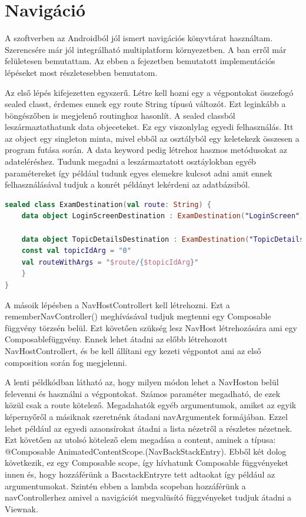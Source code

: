 \section{Navigáció}
\label{sec:Nav}

A szoftverben az Androidból jól ismert navigációs könyvtárat használtam.
Szerencsére már jól integrálható multiplatform környezetben.
A ban erről már felületesen bemutattam.
Az ebben a fejezetben bemutatott implementációs lépéseket most részletesebben bemutatom.

Az első lépés kifejezetten egyszerű.
Létre kell hozni egy a végpontokat összefogó sealed classt, érdemes ennek egy route String típusú változót.
Ezt leginkább a böngészőben is megjelenő routinghoz hasonlít.
A sealed classból leszármaztathatunk data objeceteket. Ez egy viszonlylag egyedi felhasználás.
Itt az object egy singleton minta, mivel ebből az osztályból egy keletekezk összesen a program futása során.
A data keyword pedig létrehoz hasznos metódusokat az adateléréshez.
Tudunk megadni a leszármaztatott osztáylokban egyéb paramétereket így például tudunk egyes elemekre kulcsot adni amit ennek felhasználásával tudjuk a konrét példányt lekérdeni az adatbázsiból.

\begin{lstlisting}[caption={Példa a végpontok felvételére.}, label={lst:NavDestExample}, language=Kotlin]
sealed class ExamDestination(val route: String) {
    data object LoginScreenDestination : ExamDestination("LoginScreen")

    data object TopicDetailsDestination : ExamDestination("TopicDetails") {
    const val topicIdArg = "0"
    val routeWithArgs = "$route/{$topicIdArg}"
    }
}        
\end{lstlisting}

A másoik lépésben a NavHostControllert kell létrehozni. Ezt a rememberNavController() meghívásával tudjuk megtenni egy Composable függvény törzsén belül.
Ezt követően szükség lesz NavHost létrehozására ami egy Composablefüggvény.
Ennek lehet átadni az előbb létrehozott NavHostControllert, és be kell állítani egy kezeti végpontot ami az első composition során fog megjelenni.

A lenti példkódban látható az, hogy milyen módon lehet a NavHoston belül felevenni és használni a végpontokat.
Számos paraméter megadható, de ezek közül csak a route kötelező.
Megadahatók egyéb argumentumok, amiket az egyik képernyőről a másiknak szeretnénk átadani navArgumentek formájában.
Ezzel lehet például az egyedi azaonsírokat átadni a lista nézetről a részletes nézetnek.
Ezt követően az utolsó kötelező elem megadása a content, aminek a típusa: @Composable AnimatedContentScope.(NavBackStackEntry).
Ebből két dolog következik, ez egy Composable scope, így hívhatunk Composable függvényeket innen és, hogy hozzáférünk a BacstackEntryre tett adtaokat így például az argumentumokat.
Szintén ebben a lambda scopeban hozzáférünk a navControllerhez amivel a navigációt megvalüsító függvényeket tudjuk átadni a Viewnak.

